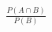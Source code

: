 \documentclass[preview]{standalone}
\begin{document}
\begin{align*}
\frac{P(A \cap B)}{P(B)}
\end{align*}
\end{document}
